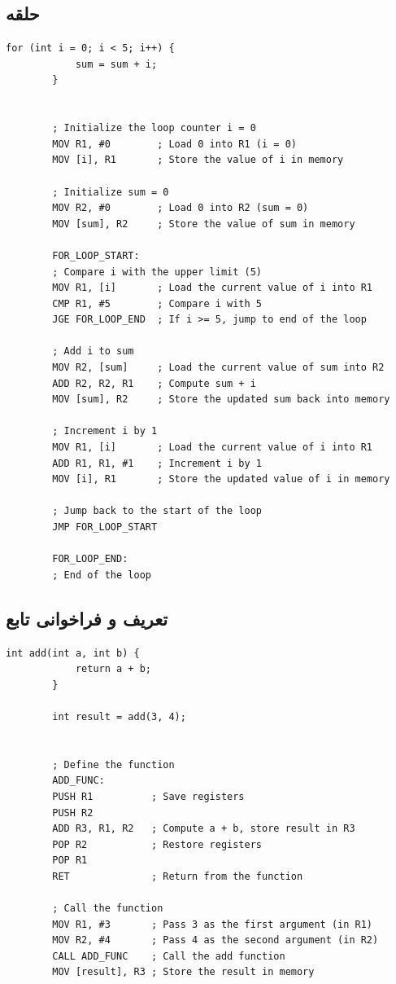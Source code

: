 \documentclass[12pt, a4paper]{report}
\begin{document}
\subsection{حلقه }
\begin{LTR} %
	\begin{lstlisting}[breaklines=true]
		for (int i = 0; i < 5; i++) {
			sum = sum + i;
		}
		
		
		; Initialize the loop counter i = 0
		MOV R1, #0        ; Load 0 into R1 (i = 0)
		MOV [i], R1       ; Store the value of i in memory
		
		; Initialize sum = 0
		MOV R2, #0        ; Load 0 into R2 (sum = 0)
		MOV [sum], R2     ; Store the value of sum in memory
		
		FOR_LOOP_START:
		; Compare i with the upper limit (5)
		MOV R1, [i]       ; Load the current value of i into R1
		CMP R1, #5        ; Compare i with 5
		JGE FOR_LOOP_END  ; If i >= 5, jump to end of the loop
		
		; Add i to sum
		MOV R2, [sum]     ; Load the current value of sum into R2
		ADD R2, R2, R1    ; Compute sum + i
		MOV [sum], R2     ; Store the updated sum back into memory
		
		; Increment i by 1
		MOV R1, [i]       ; Load the current value of i into R1
		ADD R1, R1, #1    ; Increment i by 1
		MOV [i], R1       ; Store the updated value of i in memory
		
		; Jump back to the start of the loop
		JMP FOR_LOOP_START
		
		FOR_LOOP_END:
		; End of the loop
	\end{lstlisting}
\end{LTR}


\subsection{تعریف و فراخوانی تابع}
\begin{LTR} %
	\begin{lstlisting}[breaklines=true]
		int add(int a, int b) {
			return a + b;
		}
		
		int result = add(3, 4);
		
		
		; Define the function
		ADD_FUNC:
		PUSH R1          ; Save registers
		PUSH R2
		ADD R3, R1, R2   ; Compute a + b, store result in R3
		POP R2           ; Restore registers
		POP R1
		RET              ; Return from the function
		
		; Call the function
		MOV R1, #3       ; Pass 3 as the first argument (in R1)
		MOV R2, #4       ; Pass 4 as the second argument (in R2)
		CALL ADD_FUNC    ; Call the add function
		MOV [result], R3 ; Store the result in memory
	\end{lstlisting}
\end{LTR}
\end{document}
